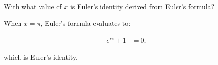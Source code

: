 With what value of $x$ is Euler's identity derived from Euler's formula?

\begin{solution}
  \vspace{0.5cm}

  When $x=\pi$, Euler's formula evaluates to:

  \begin{align*}
      e^{i\pi }+1 &= 0,
  \end{align*}

  which is Euler's identity.
  \ \\
\end{solution}